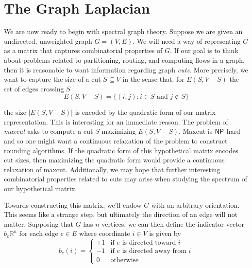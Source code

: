 
\section{The Graph Laplacian}

We are now ready to begin with spectral graph theory. Suppose we are given an undirected, unweighted graph $G = (V, E)$. We will need a way of representing $G$ as a matrix that captures combinatorial properties of $G$. If our goal is to think about problems related to partitioning, routing, and computing flows in a graph, then it is reasonable to want information regarding graph \emph{cuts}. More precisely, we want to capture the size of a cut $S \subseteq V$ in the sense that, for $E(S, V - S)$ the set of edges crossing $S$ 
\begin{equation*}
E(S, V - S) = \{ (i, j) : i \in S \text{ and } j \notin S \}
\end{equation*} 

the size $\lvert E(S, V - S) \rvert$ is encoded by the quadratic form of our matrix representation. This is interesting for an immediate reason. The problem of \emph{maxcut} asks to compute a cut $S$ maximizing $E(S, V - S)$. Maxcut is $\mathsf{NP}$-hard and so one might want a continuous relaxation of the problem to construct rounding algorithms. If the quadratic form of this hypothetical matrix encodes cut sizes, then maximizing the quadratic form would provide a continuous relaxation of maxcut. Additionally, we may hope that further interesting combinatorial properties related to cuts may arise when studying the spectrum of our hypothetical matrix.

Towards constructing this matrix, we'll endow $G$ with an arbitrary orientation. This seems like a strange step, but ultimately the direction of an edge will not matter. Supposing that $G$ has $n$ vertices, we can then define the indicator vector $b_e \mathbb{R}^n$ for each edge $e \in E$ where coordinate $i \in V$ is given by 
\begin{equation*}
b_e(i) = \begin{cases}
  +1 & \text{if } e \text{ is directed toward } i \\
  -1 & \text{if } e \text{ is directed away from } i \\
  0 & \text{otherwise}
\end{cases}
\end{equation*}

